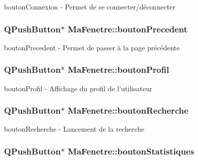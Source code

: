 bouton\-Connexion -\/ Permet de se connecter/déconnecter 

\hypertarget{class_ma_fenetre_a53b01801ba121b8240df4f1f8c9330b3}{
\subsubsection[{bouton\-Precedent}]{\setlength{\rightskip}{0pt plus 5cm}Q\-Push\-Button$\ast$ Ma\-Fenetre\-::bouton\-Precedent\hspace{0.3cm}{\ttfamily [protected]}}}\label{class_ma_fenetre_a53b01801ba121b8240df4f1f8c9330b3}


bouton\-Precedent -\/ Permet de passer à la page précédente 

\hypertarget{class_ma_fenetre_a406ca1016af97e007bc633efabed744b}{
\subsubsection[{bouton\-Profil}]{\setlength{\rightskip}{0pt plus 5cm}Q\-Push\-Button$\ast$ Ma\-Fenetre\-::bouton\-Profil\hspace{0.3cm}{\ttfamily [protected]}}}\label{class_ma_fenetre_a406ca1016af97e007bc633efabed744b}


bouton\-Profil -\/ Affichage du profil de l'utilisateur 

\hypertarget{class_ma_fenetre_afe6e47d40e487fccd18d4bcc3c57e64e}{
\subsubsection[{bouton\-Recherche}]{\setlength{\rightskip}{0pt plus 5cm}Q\-Push\-Button$\ast$ Ma\-Fenetre\-::bouton\-Recherche\hspace{0.3cm}{\ttfamily [protected]}}}\label{class_ma_fenetre_afe6e47d40e487fccd18d4bcc3c57e64e}


bouton\-Recherche -\/ Lancement de la recherche 

\hypertarget{class_ma_fenetre_ac438e7ad115265305422aadd11a04b50}{
\subsubsection[{bouton\-Statistiques}]{\setlength{\rightskip}{0pt plus 5cm}Q\-Push\-Button$\ast$ Ma\-Fenetre\-::bouton\-Statistiques\hspace{0.3cm}{\ttfamily [protected]}}}\label{class_ma_fenetre_ac438e7ad115265305422aadd11a04b50}


